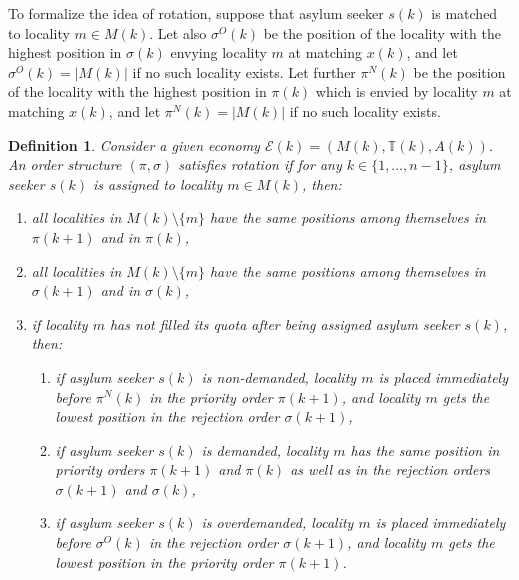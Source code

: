 \documentclass[12pt,fleqn]{article}
\newtheorem{definition}{Definition}
\begin{document}
To formalize the idea of rotation, suppose that asylum seeker $s(k)$ is matched to locality $m\in M(k)$. Let also $\sigma^O(k)$ be the position of the locality with the highest position in $\sigma(k)$ envying locality $m$ at matching $x(k)$, and let $\sigma^O(k)=|M(k)|$ if no such locality exists. Let further $\pi^N(k)$ be the position of the locality with the highest position in $\pi(k)$ which is envied by locality $m$ at matching $x(k)$, and let $\pi^N(k)=|M(k)|$ if no such locality exists.
\begin{definition}\rm\label{DEF:Rotation}
Consider a given economy $\mathcal{E}(k)=(M(k),\mathbb{T}(k),A(k))$. An order structure $(\pi,\sigma)$ satisfies rotation if for any $k\in\{1,\ldots,n-1\}$, asylum seeker $s(k)$ is assigned to locality $m\in M(k)$, then:
\begin{enumerate}
\item[(i)] all localities in $M(k)\setminus \{m\}$ have the same positions among themselves in $\pi(k+1)$ and in $\pi(k)$,

\item[(ii)] all localities in $M(k)\setminus \{m\}$ have the same positions among themselves in $\sigma(k+1)$ and in $\sigma(k)$,

\item[(iii)] if locality $m$ has not filled its quota after being assigned asylum seeker $s(k)$, then:
\begin{enumerate}
\item[(a)] if asylum seeker $s(k)$ is non-demanded, locality $m$ is placed immediately before $\pi^{N}(k)$ in the priority order $\pi(k+1)$, and locality $m$ gets the lowest position in the rejection order $\sigma(k+1)$,
\item[(b)] if asylum seeker $s(k)$ is demanded, locality $m$ has the same position in priority orders $\pi(k+1)$ and $\pi(k)$ as well as in the rejection orders $\sigma(k+1)$ and $\sigma(k)$,
\item[(c)] if asylum seeker $s(k)$ is overdemanded, locality $m$ is placed immediately before $\sigma^{O}(k)$ in the rejection order $\sigma(k+1)$, and locality $m$ gets the lowest position in the priority order $\pi(k+1)$.
\end{enumerate}
\end{enumerate}
\end{definition}
\end{document}
